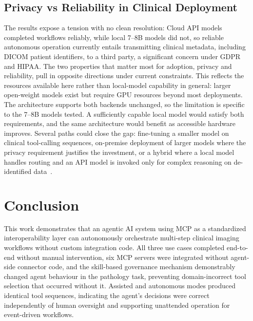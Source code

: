 \documentclass[1p,12pt]{elsarticle}
\begin{document}
\subsection{Privacy vs Reliability in Clinical Deployment}
The results expose a tension with no clean resolution: Cloud API models completed workflows reliably, while local 7--8B models did not, so reliable autonomous operation currently entails transmitting clinical metadata, including DICOM patient identifiers, to a third party, a significant concern under GDPR and HIPAA. The two properties that matter most for adoption, privacy and reliability, pull in opposite directions under current constraints. This reflects the resources available here rather than local-model capability in general: larger open-weight models exist but require GPU resources beyond most deployments. The architecture supports both backends unchanged, so the limitation is specific to the 7--8B models tested. A sufficiently capable local model would satisfy both requirements, and the same architecture would benefit as accessible hardware improves. Several paths could close the gap: fine-tuning a smaller model on clinical tool-calling sequences, on-premise deployment of larger models where the privacy requirement justifies the investment, or a hybrid where a local model handles routing and an API model is invoked only for complex reasoning on de-identified data~\cite{trustworthyai2025, dietrich2025agentic, agiformedicalimaging2025}.

\section{Conclusion}
This work demonstrates that an agentic AI system using MCP as a standardized interoperability layer can autonomously orchestrate multi-step clinical imaging workflows without custom integration code. All three use cases completed end-to-end without manual intervention, six MCP servers were integrated without agent-side connector code, and the skill-based governance mechanism demonstrably changed agent behaviour in the pathology task, preventing domain-incorrect tool selection that occurred without it. Assisted and autonomous modes produced identical tool sequences, indicating the agent's decisions were correct independently of human oversight and supporting unattended operation for event-driven workflows.
\end{document}
